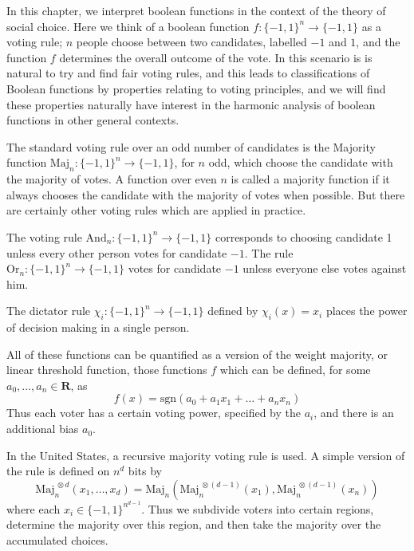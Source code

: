 In this chapter, we interpret boolean functions in the context of the theory of social choice. Here we think of a boolean function $f: \{ -1, 1 \}^n \to \{ -1, 1 \}$ as a voting rule; $n$ people choose between two candidates, labelled $-1$ and $1$, and the function $f$ determines the overall outcome of the vote. In this scenario is is natural to try and find fair voting rules, and this leads to classifications of Boolean functions by properties relating to voting principles, and we will find these properties naturally have interest in the harmonic analysis of boolean functions in other general contexts.

The standard voting rule over an odd number of candidates is the Majority function $\text{Maj}_n: \{ -1, 1 \}^n \to \{ -1, 1 \}$, for $n$ odd, which choose the candidate with the majority of votes. A function over even $n$ is called a majority function if it always chooses the candidate with the majority of votes when possible. But there are certainly other voting rules which are applied in practice.

\begin{example}
    The voting rule $\text{And}_n: \{ -1, 1 \}^n \to \{ -1, 1 \}$ corresponds to choosing candidate 1 unless every other person votes for candidate $-1$. The rule $\text{Or}_n: \{ -1, 1 \}^n \to \{ -1, 1 \}$ votes for candidate $-1$ unless everyone else votes against him.
\end{example}

\begin{example}
    The dictator rule $\chi_i: \{ -1, 1 \}^n \to \{ -1, 1 \}$ defined by $\chi_i(x) = x_i$ places the power of decision making in a single person.
\end{example}

\begin{example}
    All of these functions can be quantified as a version of the weight majority, or linear threshold function, those functions $f$ which can be defined, for some $a_0, \dots, a_n \in \mathbf{R}$, as
    \[ f(x) = \text{sgn}(a_0 + a_1x_1 + \dots + a_nx_n) \]
    Thus each voter has a certain voting power, specified by the $a_i$, and there is an additional bias $a_0$. 
\end{example}

\begin{example}
    In the United States, a recursive majority voting rule is used. A simple version of the rule is defined on $n^d$ bits by
    \[ \text{Maj}_n^{\ \otimes d}(x_1, \dots, x_d) = \text{Maj}_n(\text{Maj}^{\ \otimes (d-1)}_n(x_1), \text{Maj}^{\ \otimes (d-1)}_n(x_n)) \]
    where each $x_i \in \{ -1, 1 \}^{n^{d-1}}$. Thus we subdivide voters into certain regions, determine the majority over this region, and then take the majority over the accumulated choices.
\end{example}

